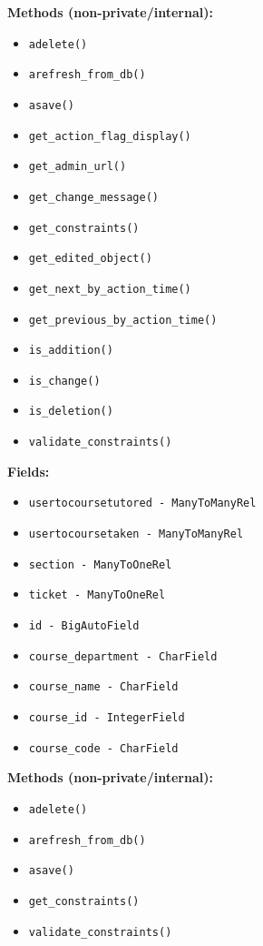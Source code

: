 \documentclass[oneside,openany,obeyspaces]{book}
\begin{document}
\begin{flushleft}
    \textbf{Methods (non-private/internal):}
    \begin{itemize}
        \item \texttt{adelete()}
        \item \texttt{arefresh\_from\_db()}
        \item \texttt{asave()}
        \item \texttt{get\_action\_flag\_display()}
        \item \texttt{get\_admin\_url()}
        \item \texttt{get\_change\_message()}
        \item \texttt{get\_constraints()}
        \item \texttt{get\_edited\_object()}
        \item \texttt{get\_next\_by\_action\_time()}
        \item \texttt{get\_previous\_by\_action\_time()}
        \item \texttt{is\_addition()}
        \item \texttt{is\_change()}
        \item \texttt{is\_deletion()}
        \item \texttt{validate\_constraints()}
    \end{itemize}

    \textbf{Fields:}
    \begin{itemize}
        \item \texttt{usertocoursetutored - ManyToManyRel}
        \item \texttt{usertocoursetaken - ManyToManyRel}
        \item \texttt{section - ManyToOneRel}
        \item \texttt{ticket - ManyToOneRel}
        \item \texttt{id - BigAutoField}
        \item \texttt{course\_department - CharField}
        \item \texttt{course\_name - CharField}
        \item \texttt{course\_id - IntegerField}
        \item \texttt{course\_code - CharField}
    \end{itemize}

    \textbf{Methods (non-private/internal):}
    \begin{itemize}
        \item \texttt{adelete()}
        \item \texttt{arefresh\_from\_db()}
        \item \texttt{asave()}
        \item \texttt{get\_constraints()}
        \item \texttt{validate\_constraints()}
    \end{itemize}


\end{flushleft}
\end{document}

